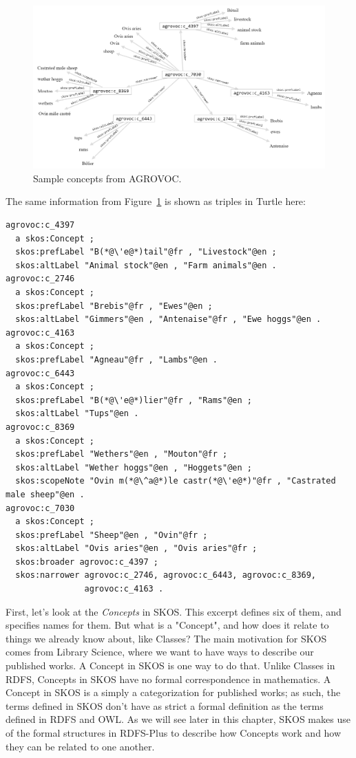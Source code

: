 \begin{figure}
\centering
\includegraphics[width=5in]{SWWOv3/media/ch11/figure11-1.png}
\caption{Sample concepts from AGROVOC.}
\label{fig:ch11.1}
\end{figure}


The same information from Figure~\ref{fig:ch11.1} is shown as triples in Turtle
here:

\begin{lstlisting}
agrovoc:c_4397
  a skos:Concept ;
  skos:prefLabel "B(*@\'e@*)tail"@fr , "Livestock"@en ;
  skos:altLabel "Animal stock"@en , "Farm animals"@en .
agrovoc:c_2746
  a skos:Concept ;
  skos:prefLabel "Brebis"@fr , "Ewes"@en ;
  skos:altLabel "Gimmers"@en , "Antenaise"@fr , "Ewe hoggs"@en .
agrovoc:c_4163
  a skos:Concept ;
  skos:prefLabel "Agneau"@fr , "Lambs"@en .
agrovoc:c_6443
  a skos:Concept ;
  skos:prefLabel "B(*@\'e@*)lier"@fr , "Rams"@en ;
  skos:altLabel "Tups"@en .
agrovoc:c_8369
  a skos:Concept ;
  skos:prefLabel "Wethers"@en , "Mouton"@fr ;
  skos:altLabel "Wether hoggs"@en , "Hoggets"@en ;
  skos:scopeNote "Ovin m(*@\^a@*)le castr(*@\'e@*)"@fr , "Castrated male sheep"@en .
agrovoc:c_7030
  a skos:Concept ;
  skos:prefLabel "Sheep"@en , "Ovin"@fr ;
  skos:altLabel "Ovis aries"@en , "Ovis aries"@fr ;
  skos:broader agrovoc:c_4397 ;
  skos:narrower agrovoc:c_2746, agrovoc:c_6443, agrovoc:c_8369,
                agrovoc:c_4163 .
\end{lstlisting}

First, let's look at the \textit{Concepts} in SKOS. This excerpt defines six of them, and specifies
names for them.  But what is a "Concept", and how does it relate to things we already know about, 
like Classes?  The main motivation for SKOS comes from Library Science, where we want to have ways to describe our 
published works.  A Concept in SKOS is one way to do that.  Unlike Classes in RDFS, Concepts in SKOS have no formal correspondence in mathematics. A Concept in SKOS is a simply a categorization for published works; as such, the terms defined in SKOS don't have as strict a formal definition as the terms defined in RDFS and OWL.  As we will see later in this chapter, SKOS makes use of the formal structures in RDFS-Plus to describe how Concepts work and how they can be related to one another. 

